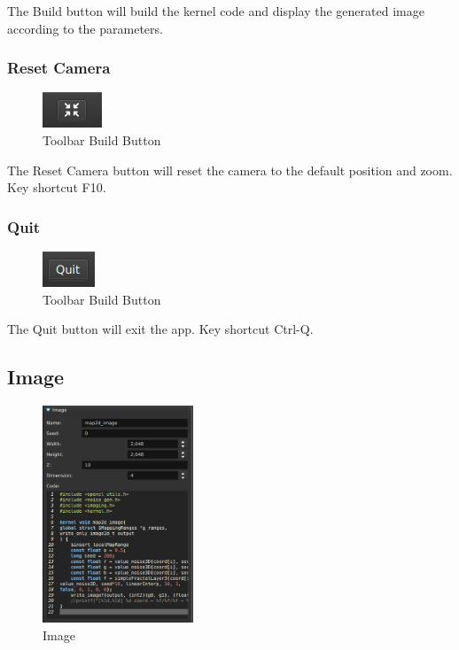 The Build button will build the kernel code and display the generated image
according to the parameters.

\subsubsection{Reset Camera}

\begin{figure}[h]
\centering
\includegraphics{imgs/toolbar-reset-camera-0.png}
\caption{Toolbar Build Button}\label{fig:toolbar-reset-camera-0}
\end{figure}

The Reset Camera button will reset the camera to the default position and zoom.
Key shortcut F10.

\subsubsection{Quit}

\begin{figure}[h]
\centering
\includegraphics{imgs/toolbar-quit-0.png}
\caption{Toolbar Build Button}\label{fig:toolbar-quit-0}
\end{figure}

The Quit button will exit the app. Key shortcut Ctrl-Q.

\label{sec:image}\subsection{Image}

\begin{figure}[h]
\centering
\includegraphics[width=0.4\textwidth]{imgs/main-image-0.png}
\caption{Image}\label{fig:main-image-0}
\end{figure}

